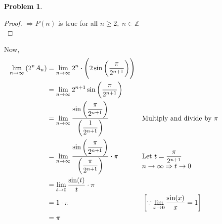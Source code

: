 \documentclass[14]{article}
\theoremstyle{definition}
\newtheorem{prob}{Problem}
\begin{document}
\begin{prob}
\begin{proof}
$\Rightarrow P(n)$ is true for all $n \geq 2,\; n \in \mathbb{Z}$\\
\end{proof}
Now,
\begin{align*}
\lim\limits_{n \to \infty} \left(2^n A_n\right) &= \lim\limits_{n \to \infty} 2^n \cdot \left( 2 \sin\left(\dfrac{\pi}{2^{n+1}}\right) \right)\\
&= \lim\limits_{n \to \infty} 2^{n+1} \sin \left(\dfrac{\pi}{2^{n+1}}\right)\\
&= \lim\limits_{n \to \infty} \dfrac{\sin \left(\dfrac{\pi}{2^{n+1}}\right)}{\left(\dfrac{1}{2^{n+1}}\right)} && \text{Multiply and divide by } \pi\\
&= \lim\limits_{n \to \infty} \dfrac{\sin \left(\dfrac{\pi}{2^{n+1}}\right)}{\left(\dfrac{\pi}{2^{n+1}}\right)} \cdot \pi && \parbox[t]{5cm}{Let $t = \dfrac{\pi}{2^{n + 1}}\\
n \to \infty \Rightarrow t \to 0
$}\\
&= \lim\limits_{t \to 0} \dfrac{\sin(t)}{t}\cdot \pi\\
&= 1 \cdot \pi && \left[\because \lim\limits_{x \to 0} \dfrac{\sin(x)}{x} = 1 \right]\\
&= \pi
\end{align*}
\end{prob}
\pagebreak
\end{document}
